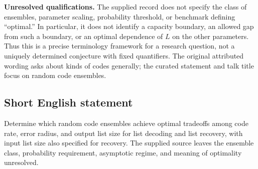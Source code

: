 \documentclass[11pt]{article}
\begin{document}
\textbf{Unresolved qualifications.} The supplied record does not specify the class of ensembles, parameter scaling, probability threshold, or benchmark defining ``optimal.'' In particular, it does not identify a capacity boundary, an allowed gap from such a boundary, or an optimal dependence of \(L\) on the other parameters. Thus this is a precise terminology framework for a research question, not a uniquely determined conjecture with fixed quantifiers. The original attributed wording asks about kinds of codes generally; the curated statement and talk title focus on random code ensembles.
\subsection{Short English statement}
Determine which random code ensembles achieve optimal tradeoffs among code rate, error radius, and output list size for list decoding and list recovery, with input list size also specified for recovery. The supplied source leaves the ensemble class, probability requirement, asymptotic regime, and meaning of optimality unresolved.
\end{document}
